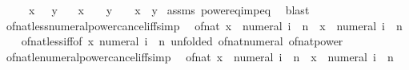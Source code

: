 \begin{isabellebody}
\ \ \ {\isachardoublequoteopen}{}\ {\isasymle}\ x{\isachardoublequoteclose}\ {\isachardoublequoteopen}{}\ {\isasymle}\ y{\isachardoublequoteclose}\isanewline
\ \ \ {\isachardoublequoteopen}{\isacharparenleft}{\kern0pt}x\ {\isacharcircum}{\kern0pt}\ {}\ {\isacharequal}{\kern0pt}\ y\ {\isacharcircum}{\kern0pt}\ {}{\isacharparenright}{\kern0pt}\ {\isasymlongleftrightarrow}\ x\ {\isacharequal}{\kern0pt}\ y{\isachardoublequoteclose}\isanewline
%
\isadelimproof
%
\endisadelimproof
%
\isatagproof
{}\isamarkupfalse%
\ assms\ power{}{\isacharunderscore}{\kern0pt}eq{\isacharunderscore}{\kern0pt}imp{\isacharunderscore}{\kern0pt}eq\ \isamarkupfalse%
\ blast%
\endisatagproof
{\isafoldproof}%
%
\isadelimproof
\isanewline
%
\endisadelimproof
\isanewline
{}\isamarkupfalse%
\ of{\isacharunderscore}{\kern0pt}nat{\isacharunderscore}{\kern0pt}less{\isacharunderscore}{\kern0pt}numeral{\isacharunderscore}{\kern0pt}power{\isacharunderscore}{\kern0pt}cancel{\isacharunderscore}{\kern0pt}iff{\isacharbrackleft}{\kern0pt}simp{\isacharbrackright}{\kern0pt}{\isacharcolon}{\kern0pt}\isanewline
\ \ {\isachardoublequoteopen}of{\isacharunderscore}{\kern0pt}nat\ x\ {\isacharless}{\kern0pt}\ numeral\ i\ {\isacharcircum}{\kern0pt}\ n\ {\isasymlongleftrightarrow}\ x\ {\isacharless}{\kern0pt}\ numeral\ i\ {\isacharcircum}{\kern0pt}\ n{\isachardoublequoteclose}\isanewline
%
\isadelimproof
\ \ %
\endisadelimproof
%
\isatagproof
{}\isamarkupfalse%
\ of{\isacharunderscore}{\kern0pt}nat{\isacharunderscore}{\kern0pt}less{\isacharunderscore}{\kern0pt}iff{\isacharbrackleft}{\kern0pt}of\ x\ {\isachardoublequoteopen}numeral\ i\ {\isacharcircum}{\kern0pt}\ n{\isachardoublequoteclose}{\isacharcomma}{\kern0pt}\ unfolded\ of{\isacharunderscore}{\kern0pt}nat{\isacharunderscore}{\kern0pt}numeral\ of{\isacharunderscore}{\kern0pt}nat{\isacharunderscore}{\kern0pt}power{\isacharbrackright}{\kern0pt}\ \isacommand{{\isachardot}{\kern0pt}}\isamarkupfalse%
%
\endisatagproof
{\isafoldproof}%
%
\isadelimproof
\isanewline
%
\endisadelimproof
\isanewline
{}\isamarkupfalse%
\ of{\isacharunderscore}{\kern0pt}nat{\isacharunderscore}{\kern0pt}le{\isacharunderscore}{\kern0pt}numeral{\isacharunderscore}{\kern0pt}power{\isacharunderscore}{\kern0pt}cancel{\isacharunderscore}{\kern0pt}iff{\isacharbrackleft}{\kern0pt}simp{\isacharbrackright}{\kern0pt}{\isacharcolon}{\kern0pt}\isanewline
\ \ {\isachardoublequoteopen}of{\isacharunderscore}{\kern0pt}nat\ x\ {\isasymle}\ numeral\ i\ {\isacharcircum}{\kern0pt}\ n\ {\isasymlongleftrightarrow}\ x\ {\isasymle}\ numeral\ i\ {\isacharcircum}{\kern0pt}\ n{\isachardoublequoteclose}\isanewline

\end{isabellebody}
